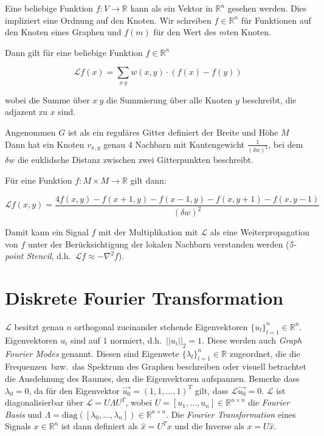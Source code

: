Eine beliebige Funktion $f: V \rightarrow \mathbb{R}$ kann als ein Vektor in $\mathbb{R}^n$ gesehen werden.
Dies impliziert eine Ordnung auf den Knoten.
Wir schreiben $f \in \mathbb{R}^n$ für Funktionen auf den Knoten eines Graphen und $f(m)$ für den Wert des $m$ten Knoten.

Dann gilt für eine beliebige Funktion $f \in \mathbb{R}^n$

\begin{equation}
  \mathcal{L}f(x) = \sum_{x~y} w(x, y) \cdot (f(x) - f(y))
\end{equation}

wobei die Summe über $x~y$ die Summierung über alle Knoten $y$ beschreibt, die adjazent zu $x$ sind.

Angenommen $G$ ist als ein reguläres Gitter definiert der Breite und Höhe $M$
Dann hat ein Knoten $v_{x,y}$ genau 4 Nachbarn mit Kantengewicht $\frac{1}{{(\delta w)}^2}$, bei dem $\delta w$ die euklidsche Distanz zwischen zwei Gitterpunkten beschreibt.

Für eine Funktion $f: M \times M \rightarrow \mathbb{R}$ gilt dann:

\begin{equation}
  \mathcal{L}f(x, y) = \frac{4f(x,y) - f(x+1, y) - f(x-1, y) - f(x, y+1) - f(x, y-1)}{{(\delta w)}^2}
\end{equation}

Damit kann ein Signal $f$ mit der Multiplikation mit $\mathcal{L}$ als eine Weiterpropagation von $f$ unter der Berücksichtigung der lokalen Nachbarn verstanden werden (\emph{5-point Stencil}, d.h.\ $\mathcal{L}f \approx - \nabla^2 f$).

\section{Diskrete Fourier Transformation}

$\mathcal{L}$ besitzt genau $n$ orthogonal zueinander stehende Eigenvektoren $\lbrace u_l \rbrace_{l=1}^n \in \mathbb{R}^n$.
Eigenvektoren $u_i$ sind auf $1$ normiert, d.h.\ $||u_i||_2 = 1$.
Diese werden auch \emph{Graph Fourier Modes} genannt.
Diesen sind Eigenwete $\lbrace \lambda_l \rbrace_{l=1}^n \in \mathbb{R}$ zugeordnet, die die \glqq{}Frequenzen\grqq\ bzw.\ das Spektrum des Graphen beschreiben oder visuell betrachtet die Ausdehnung des Raumes, den die Eigenvektoren aufspannen.
Bemerke dass $\lambda_0 = 0$, da für den Eigenvektor $\vec{u_0} = {(1, 1, \ldots, 1)}^T$ gilt, dass $\mathcal{L}\vec{u_0} = 0$.
$\mathcal{L}$ ist diagonalisierbar über $\mathcal{L} = U \Lambda U^T$, wobei $U = [u_1, \ldots, u_n] \in \mathbb{R}^{n \times n}$ die \emph{Fourier Basis} und $\Lambda = \text{diag}([\lambda_0, \ldots, \lambda_n]) \in \mathbb{R}^{n \times n}$.
Die \emph{Fourier Transformation} eines Signals $x \in \mathbb{R}^n$ ist dann definiert als $\hat{x} = U^{T}x$ und die Inverse als $x = U\hat{x}$.

